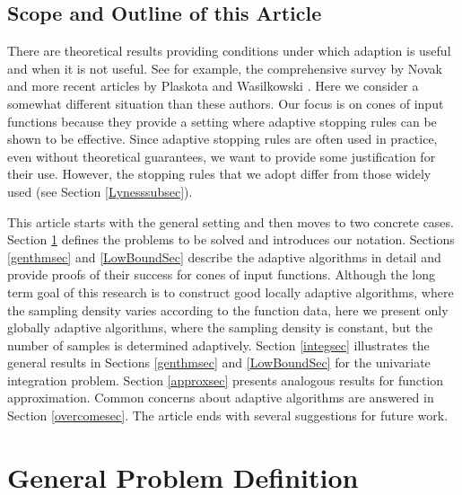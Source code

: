 \documentclass[]{elsarticle}
\theoremstyle{definition}
\theoremstyle{remark}
\begin{document}
\subsection{Scope and Outline of this Article} 
There are theoretical results providing conditions under which adaption is useful and when it is not useful. See for example, the comprehensive survey by Novak \cite{Nov96a} and more recent articles by Plaskota and Wasilkowski \cite{PlaWas05a,PlaEtal08a}. Here we consider a somewhat different situation than these authors.  Our focus is on cones of input functions because they provide a setting where adaptive stopping rules can be shown to be effective. Since adaptive stopping rules are often used in practice, even without theoretical guarantees, we want to provide some justification for their use.  However, the stopping rules that we adopt differ from those widely used (see Section \ref{Lynesssubsec}).

This article starts with the general setting and then moves to two concrete cases.  Section \ref{probdefsec} defines the problems to be solved and introduces our notation.  Sections \ref{genthmsec} and \ref{LowBoundSec} describe the adaptive algorithms in detail and provide proofs of their success for cones of input functions.  Although the long term goal of this research is to construct good locally adaptive algorithms, where the sampling density varies according to the function data, here we present only globally adaptive algorithms, where the sampling density is constant, but the number of samples is determined adaptively.  Section \ref{integsec} illustrates the general results in Sections \ref{genthmsec} and \ref{LowBoundSec} for the univariate integration problem.  Section \ref{approxsec}  presents analogous results for function approximation.  Common concerns about adaptive algorithms are answered in Section \ref{overcomesec}. The article ends with several suggestions for future work.

\section{General Problem Definition} \label{probdefsec}
\end{document}
